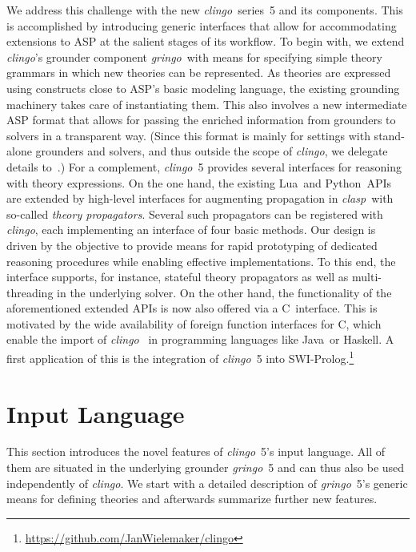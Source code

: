 \documentclass[a4paper,USenglish]{oasics-v2016}
\newcommand{\sysfont}{\textit}
\newcommand{\clasp}{\sysfont{clasp}}
\newcommand{\clingo}{\sysfont{clingo}}
\newcommand{\gringo}{\sysfont{gringo}}
\newcommand{\python}{Python}
\newcommand{\lua}{Lua}
\newcommand{\C}{C}
\newcommand{\java}{Java}
\newcommand{\haskell}{Haskell}
\begin{document}
We address this challenge with the new \clingo\ series~5 and its components.
%
This is accomplished by introducing generic interfaces that allow for accommodating extensions to ASP at the salient stages of its workflow.
%
To begin with,
we extend \clingo's grounder component \gringo\ with means for specifying simple theory grammars in which new theories can be represented.
As theories are expressed using constructs close to ASP's basic modeling language,
the existing grounding machinery takes care of instantiating them.
%
This also involves a new intermediate ASP format that allows for passing the enriched information from grounders to solvers in a transparent way.
(Since this format is mainly for settings with stand-alone grounders and solvers,
 and thus outside the scope of \clingo,
 we delegate details to~\cite{gekakaosscwa16b}.) %
%
For a complement,
\clingo~5 provides several interfaces for reasoning with theory expressions.
%
On the one hand,
the existing \lua\ and \python\ APIs are extended by high-level interfaces for
augmenting propagation in \clasp\ with so-called \emph{theory propagators}.
Several such propagators can be registered with \clingo,
each implementing an interface of four basic methods.
Our design is driven by the objective to provide means for rapid prototyping of dedicated reasoning procedures while enabling effective implementations.
To this end,
the interface supports, for instance, stateful theory propagators as well as multi-threading in the underlying solver.
%
On the other hand,
the functionality of the aforementioned extended APIs is now also offered via a \C\ interface.
This is motivated by the wide availability of foreign function interfaces for \C, which enable the import of \clingo\ %
in %
programming languages like \java\ or \haskell.
A first application of this is the integration of \clingo~5 into SWI-Prolog.\footnote{\url{https://github.com/JanWielemaker/clingo}}

\section{Input Language}\label{sec:language}

This section introduces the novel features of \clingo~5's input language.
All of them are situated in the underlying grounder \gringo~5 and can thus
also be used independently of \clingo.
%
We start with a detailed description of \gringo~5's generic means for defining theories
and afterwards summarize further %
new features.
\end{document}
